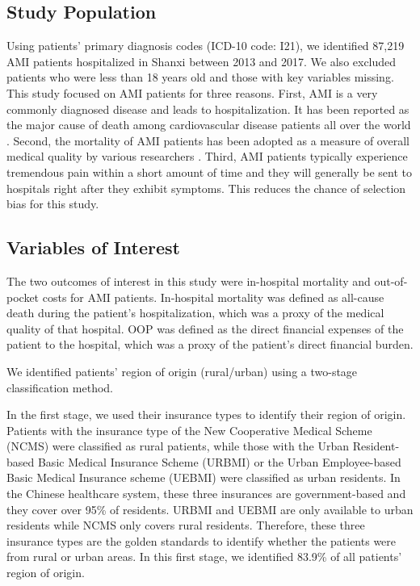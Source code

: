 \documentclass[ijerph,article,submit,moreauthors,pdftex,10pt,a4paper]{mdpi}
\theoremstyle{mdpi}
\newcounter{ex}
\newcounter{re}
\theoremstyle{mdpidefinition}
\begin{document}
\subsection{Study Population}
Using patients' primary diagnosis codes (ICD-10 code: I21), we identified 87,219 AMI patients hospitalized in Shanxi between 2013 and 2017. We also excluded patients who were less than 18 years old and those with key variables missing. This study focused on AMI patients for three reasons. First, AMI is a very commonly diagnosed disease and leads to hospitalization. It has been reported as the major cause of death among cardiovascular disease patients all over the world \cite{chung2015comparison}. Second, the mortality of AMI patients has been adopted as a measure of overall medical quality by various researchers \cite{kessler2000hospital, gaynor2013death}. Third, AMI patients typically experience tremendous pain within a short amount of time and they will generally be sent to hospitals right after they exhibit symptoms. This reduces the chance of selection bias for this study.

\subsection{Variables of Interest}

The two outcomes of interest in this study were in-hospital mortality and out-of-pocket costs for AMI patients. In-hospital mortality was defined as all-cause death during the patient's hospitalization, which was a proxy of the medical quality of that hospital. OOP was defined as the direct financial expenses of the patient to the hospital, which was a proxy of the patient's direct financial burden.

We identified patients' region of origin (rural/urban) using a two-stage classification method. 

In the first stage, we used their insurance types to identify their region of origin. Patients with the insurance type of the New Cooperative Medical Scheme (NCMS) were classified as rural patients, while those with the Urban Resident-based Basic Medical Insurance Scheme (URBMI) or the Urban Employee-based Basic Medical Insurance scheme (UEBMI) were classified as urban residents. In the Chinese healthcare system, these three insurances are government-based and they cover over 95\% of  residents. URBMI and UEBMI are only available to urban residents while NCMS only covers rural residents. Therefore, these three insurance types are the golden standards to identify whether the patients were from rural or urban areas. In this first stage, we identified 83.9\% of all patients' region of origin.
\end{document}
